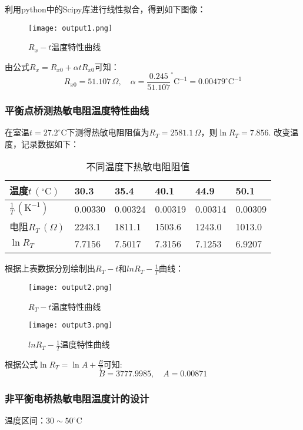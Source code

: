 \documentclass[UTF-8,twoside,cs4size]{ctexart}
\begin{document}
利用python中的Scipy库进行线性拟合，得到如下图像：
\begin{figure}[!h]
    \centering
    \texttt{[image: output1.png]}
    \caption{$R_x - t$温度特性曲线}
\end{figure}

由公式$ R_x=R_{x0}+\alpha tR_{x0} $可知：
\[R_{x0}=51.107\,\Omega,\quad \alpha=\frac{0.245}{51.107}^\circ \mathrm{C}^{-1}=0.00479^\circ \mathrm{C}^{-1}\]

\subsubsection{平衡点桥测热敏电阻温度特性曲线}
在室温$ t=27.2^\circ \mathrm{C}$下测得热敏电阻阻值为$ R_T=2581.1\,\Omega $，则$ \ln R_T=7.856 $.
改变温度，记录数据如下：
\newpage
\begin{table}[!h]
    \centering
    \renewcommand\arraystretch{1.5}
    \caption{不同温度下热敏电阻阻值}
    \begin{tabular}{|l|l|l|l|l|l|}
    \hline
        温度$ t\,(^\circ \mathrm{C}) $ & 30.3 & 35.4 & 40.1 & 44.9 & 50.1 \\ \hline
        $ \frac1T\,(\mathrm K^{-1}) $ & 0.00330 & 0.00324 & 0.00319 & 0.00314 & 0.00309 \\ \hline
        电阻$ R_T\,(\Omega) $ & 2243.1 & 1811.1 & 1503.6 & 1243.0 & 1013.0 \\ \hline
        $ \ln R_T $& 7.7156 & 7.5017 & 7.3156 & 7.1253 & 6.9207\\ \hline
    \end{tabular}
\end{table}
根据上表数据分别绘制出$R_T - t$和$lnR_T - \frac{1}{T}$曲线：
\begin{figure}[!h]
    \centering
    \texttt{[image: output2.png]}
    \caption{$R_T - t$温度特性曲线}
\end{figure}
\begin{figure}[!h]
    \centering
    \texttt{[image: output3.png]}
    \caption{$lnR_T - \frac{1}{T}$温度特性曲线}
\end{figure}

根据公式$ \ln R_T=\ln A+\frac BT $可知:
	\[B=3777.9985,\quad A=0.00871\]

\subsubsection{非平衡电桥热敏电阻温度计的设计}
温度区间：$ 30\sim 50^\circ \mathrm{C} $
	
\end{document}
